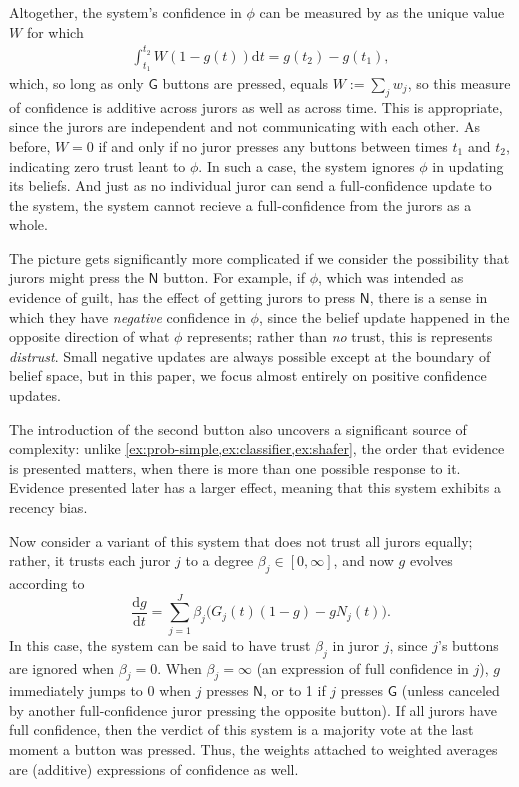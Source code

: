 \documentclass{uai2023}
\theoremstyle{plain}
\theoremstyle{definition}
\begin{document}
\begin{example}
Altogether, the system's confidence in $\phi$ can be measured by
as the unique value $W$ for which
\begin{align*}
\int_{t_1}^{t_2} W (1-g(t)) \mathrm d t =
	 g(t_2) - g(t_1),
\end{align*}
which, so long as only $\mathsf G$ buttons are pressed, equals
$W := \sum_{j} w_j$, so this measure of confidence is additive 
across jurors as well as across time. 
This is appropriate, since the jurors are independent and 
not communicating with each other.
As before, $W = 0$ if and only if no juror presses any buttons between times $t_1$ and $t_2$,
indicating zero trust leant to $\phi$. In such a case, the system ignores $\phi$ in updating its beliefs.
And just as no individual juror can send a full-confidence update to the system,
	the system cannot recieve a full-confidence from the jurors as a whole.

The picture gets significantly more complicated if we consider the possibility
that jurors might press the $\mathsf N$ button. For example, if $\phi$, which was intended
as evidence of guilt, has the effect of getting jurors to press $\mathsf N$, there is a sense
in which they have \emph{negative} confidence in $\phi$, since the belief update happened in the opposite direction of what $\phi$ represents; rather than \emph{no} trust, this is represents \emph{distrust}. 
Small negative updates are always possible except at the boundary of belief space, but in this paper, we focus almost entirely on positive confidence updates.

The introduction of the second button also uncovers a significant source of complexity:
unlike \cref{ex:prob-simple,ex:classifier,ex:shafer}, 
the order that evidence is presented matters, when there is more than one possible response to it.
Evidence presented later has a larger effect,
meaning that this system exhibits a recency bias.


Now consider a variant of this system that does
not trust all jurors equally; rather, it trusts each juror $j$
to a degree $\beta_j \in [0, \infty]$, and now $g$ evolves
according to
\[
	\frac{\mathrm dg}{\mathrm dt} = 
	\sum_{j = 1}^J \beta_j \Big( G_j(t) (1-g) 
		- g N_j(t) \Big).
\]
In this case, the system can be said to have trust $\beta_j$ in juror
$j$, since $j$'s buttons are ignored when $\beta_j = 0$. 
When $\beta_j = \infty$ (an expression of full confidence in $j$),
$g$ immediately jumps to 0 when $j$ presses 
$\mathsf N$, or to 1 if $j$ presses $\mathsf G$ (unless canceled by
another full-confidence juror pressing the opposite button).
If all jurors have full confidence, then the verdict of this system is
a majority vote at the last moment a button was pressed. 
Thus, the weights attached to weighted averages are (additive) expressions 
of confidence as well. 
\end{example}
\end{document}
